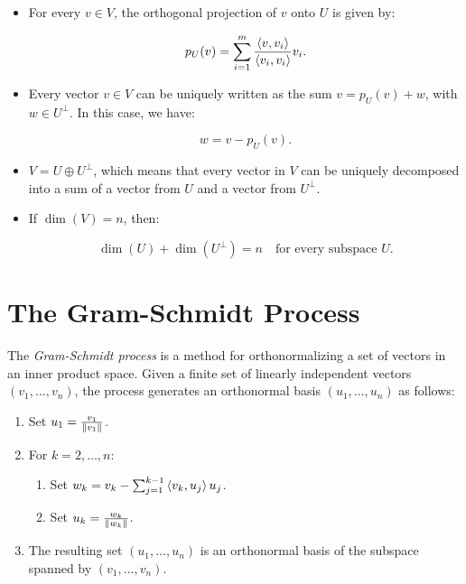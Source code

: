\begin{itemize}
    
    \item For every \( v \in V \), the orthogonal projection of \( v \) onto \( U \) is given by:
        
    \[
        p_U(v) = \sum_{i=1}^{m} \frac{\left\langle v, v_i\right\rangle}{\left\langle v_i, v_i\right\rangle} v_i.
    \]

    \item Every vector \( v \in V \) can be uniquely written as the sum \( v = p_U(v) + w \), with 
    \( w \in U^\perp \). In this case, we have:
    
    \[
        w = v - p_U(v).
    \]

    \item \( V = U \oplus U^\perp \), which means that every vector in \( V \) can be uniquely 
    decomposed into a sum of a vector from \( U \) and a vector from \( U^\perp \).

    \item If \( \dim(V) = n \), then:
  
    \[
        \dim(U) + \dim(U^\perp) = n \quad \text{for every subspace } U.
    \]

\end{itemize}

\section{The Gram-Schmidt Process}

The \emph{Gram-Schmidt process} is a method for orthonormalizing a set of vectors in an inner product space. 
Given a finite set of linearly independent vectors \( (v_1, \ldots, v_n) \), the process generates an orthonormal basis \( (u_1, \ldots, u_n) \) as follows:

\begin{enumerate}

    \item Set \( u_1 = \frac{v_1}{\left\| v_1 \right\|} \).
    
    \item For \( k = 2, \ldots, n \):

    \begin{enumerate}
        
        \item Set \( w_k = v_k - \sum_{j=1}^{k-1} \left\langle v_k, u_j\right\rangle u_j \).
        
        \item Set \( u_k = \frac{w_k}{\left\| w_k \right\|} \).
    
    \end{enumerate}

    \item The resulting set \( (u_1, \ldots, u_n) \) is an orthonormal basis of the subspace spanned 
    by \( (v_1, \ldots, v_n) \).

\end{enumerate}

